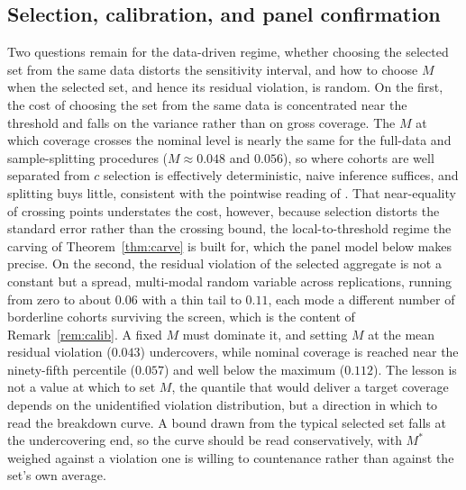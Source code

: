 \documentclass[12pt]{article}
\theoremstyle{remark}
\begin{document}
\subsection{Selection, calibration, and panel confirmation}\label{sec:calib}

Two questions remain for the data-driven regime, whether choosing the selected set from the same data
distorts the sensitivity interval, and how to choose $M$ when the selected set, and hence its residual
violation, is random. On the first, the cost of choosing the set from the same data is concentrated near the threshold and falls
on the variance rather than on gross coverage. The $M$ at which coverage crosses the nominal level is nearly
the same for the full-data and sample-splitting procedures ($M\approx0.048$ and $0.056$), so where cohorts
are well separated from $c$ selection is effectively deterministic, naive inference suffices, and splitting
buys little, consistent with the pointwise reading of \citet{leeb2005}. That near-equality of crossing
points understates the cost, however, because selection distorts the standard error rather than the
crossing bound, the local-to-threshold regime the carving of Theorem~\ref{thm:carve} is built for,
which the panel model below makes precise. On the second, the residual violation of the selected aggregate is
not a constant but a spread, multi-modal random variable across replications, running from zero to about
$0.06$ with a thin tail to $0.11$, each mode a different number of borderline cohorts surviving the
screen, which is the content of Remark~\ref{rem:calib}. A fixed $M$ must dominate it, and setting $M$ at
the mean residual violation ($0.043$) undercovers, while nominal coverage is reached near the
ninety-fifth percentile ($0.057$) and well below the maximum ($0.112$). The lesson is not a value at which
to set $M$, the quantile that would deliver a target coverage depends on the unidentified violation
distribution, but a direction in which to read the breakdown curve. A bound drawn from the typical selected
set falls at the undercovering end, so the curve should be read conservatively, with $M^\ast$ weighed against
a violation one is willing to countenance rather than against the set's own average.
\end{document}
